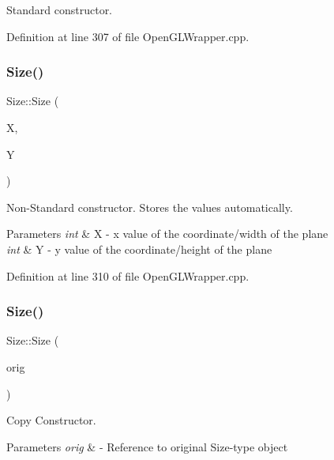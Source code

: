 Standard constructor. 



Definition at line 307 of file Open\+G\+L\+Wrapper.\+cpp.

\mbox{\label{classSize_a5786d8c0ac663667879ce1a9663afbd2}} 
\subsubsection{\texorpdfstring{Size()}{Size()}\hspace{0.1cm}{\footnotesize\ttfamily [2/3]}}
{\footnotesize\ttfamily Size\+::\+Size (\begin{DoxyParamCaption}\item[{int}]{X,  }\item[{int}]{Y }\end{DoxyParamCaption})}



Non-\/\+Standard constructor. Stores the values automatically. 


\begin{DoxyParams}{Parameters}
{\em int} & X -\/ x value of the coordinate/width of the plane \\
\hline
{\em int} & Y -\/ y value of the coordinate/height of the plane \\
\hline
\end{DoxyParams}


Definition at line 310 of file Open\+G\+L\+Wrapper.\+cpp.

\mbox{\label{classSize_a34fcd67adeb20dfb42150d701060912f}} 
\subsubsection{\texorpdfstring{Size()}{Size()}\hspace{0.1cm}{\footnotesize\ttfamily [3/3]}}
{\footnotesize\ttfamily Size\+::\+Size (\begin{DoxyParamCaption}\item[{const \mbox{\hyperlink{classSize}{Size}} \&}]{orig }\end{DoxyParamCaption})}



Copy Constructor. 


\begin{DoxyParams}{Parameters}
{\em orig} & -\/ Reference to original Size-\/type object \\
\hline
\end{DoxyParams}


